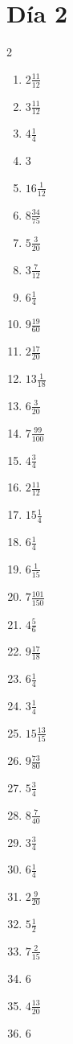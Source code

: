 \documentclass[12pt]{article}
\begin{document}
\section*{Día 2}
\begin{multicols}{2}\begin{enumerate}
\item $ 2 \frac{11}{12} $
\item $ 3 \frac{11}{12} $
\item $ 4 \frac{1}{4} $
\item $ 3 $
\item $ 16 \frac{1}{12} $
\item $ 8 \frac{34}{75} $
\item $ 5 \frac{3}{20} $
\item $ 3 \frac{7}{12} $
\item $ 6 \frac{1}{4} $
\item $ 9 \frac{19}{60} $
\item $ 2 \frac{17}{20} $
\item $ 13 \frac{1}{18} $
\item $ 6 \frac{3}{20} $
\item $ 7 \frac{99}{100} $
\item $ 4 \frac{3}{4} $
\item $ 2 \frac{11}{12} $
\item $ 15 \frac{1}{4} $
\item $ 6 \frac{1}{4} $
\item $ 6 \frac{1}{15} $
\item $ 7 \frac{101}{150} $
\item $ 4 \frac{5}{6} $
\item $ 9 \frac{17}{18} $
\item $ 6 \frac{1}{4} $
\item $ 3 \frac{1}{4} $
\item $ 15 \frac{13}{15} $
\item $ 9 \frac{73}{80} $
\item $ 5 \frac{3}{4} $
\item $ 8 \frac{7}{40} $
\item $ 3 \frac{3}{4} $
\item $ 6 \frac{1}{4} $
\item $ 2 \frac{9}{20} $
\item $ 5 \frac{1}{2} $
\item $ 7 \frac{2}{15} $
\item $ 6 $
\item $ 4 \frac{13}{20} $
\item $ 6 $

\end{enumerate}
\end{multicols}
\end{document}
